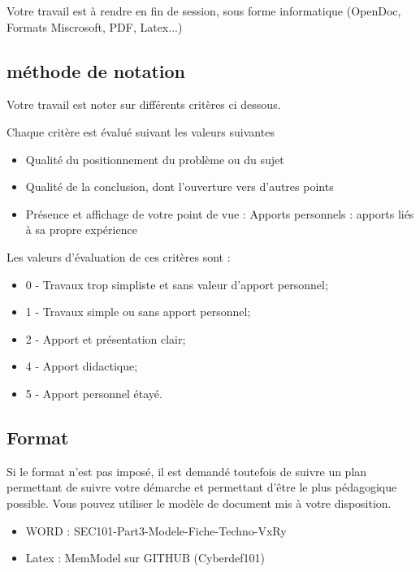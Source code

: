 Votre travail est à rendre en fin de session, sous forme informatique (OpenDoc, Formats Miscrosoft, PDF, Latex...)

\subsection{méthode de notation}

Votre travail est noter sur différents critères ci dessous.



Chaque critère est évalué suivant les valeurs suivantes

\begin{itemize}
  \item Qualité du positionnement du problème ou du sujet
  \item Qualité de la conclusion, dont l'ouverture vers d'autres points
  \item Présence et affichage de votre point de vue : Apports personnels : apports liés à sa propre expérience
\end{itemize}

Les valeurs d'évaluation de ces critères sont :

\begin{itemize}
  \item 0 - Travaux trop simpliste et sans valeur d'apport personnel;
  \item 1 - Travaux simple ou sans apport personnel;
  \item 2 - Apport et présentation clair;
  \item 4 - Apport didactique;
  \item 5 - Apport personnel étayé.
\end{itemize}


\subsection{Format}

Si le format n'est pas imposé, il est demandé toutefois de suivre un plan permettant de suivre votre démarche et permettant d'être le plus pédagogique possible.
Vous pouvez utiliser le modèle de document mis à votre disposition.

\begin{itemize}
  \item WORD : SEC101-Part3-Modele-Fiche-Techno-VxRy
  \item Latex :  MemModel sur GITHUB (Cyberdef101)
\end{itemize}

